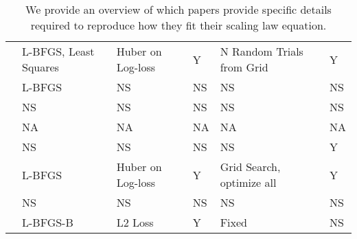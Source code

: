 \begin{table}[!h]
{\begin{tabular}{llllll}
\cite{tao2024scaling} & L-BFGS, Least Squares & Huber on Log-loss & Y & N Random Trials from Grid & Y \\
\cite{jones2021scaling} & L-BFGS & NS & NS & NS & NS \\
\cite{zhai2022scaling} & NS & NS & NS & NS & NS \\
\cite{dettmers2023case} & NA & NA & NA & NA & NA \\
\cite{dubey2024llama} & NS & NS & NS & NS & Y \\
\cite{hoffmann2022training} & L-BFGS & Huber on Log-loss & Y & Grid Search, optimize all & Y \\
\cite{ardalani2022understanding} & NS & NS & NS & NS & NS \\
\cite{clark2022unified} & L-BFGS-B & L2 Loss & Y & Fixed & NS \\ \hline
\end{tabular}%
}
\caption{We provide an overview of which papers provide specific details required to reproduce how they fit their scaling law equation.}
\label{tab:opt-details}
\end{table}
